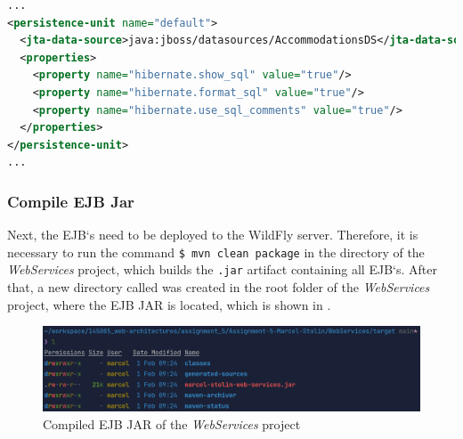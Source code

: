 \begin{lstlisting}[label=lst:03_depl_wildfly_datasource_persistance, caption=Default data source configuration, language=xml]
...
<persistence-unit name="default">
  <jta-data-source>java:jboss/datasources/AccommodationsDS</jta-data-source>
  <properties>
    <property name="hibernate.show_sql" value="true"/>
    <property name="hibernate.format_sql" value="true"/>
    <property name="hibernate.use_sql_comments" value="true"/>
  </properties>
</persistence-unit>
...
\end{lstlisting}


\subsubsection{Compile EJB Jar}\label{sec:03_depl_wildfly_jar}
Next, the EJB`s need to be deployed to the WildFly server. Therefore, it is necessary to run the command \texttt{\$ mvn clean package} in the directory of the \textit{WebServices} project, which builds the \texttt{.jar} artifact containing all EJB`s. After that, a new directory called  was created in the root folder of the \textit{WebServices} project, where the EJB JAR   is located, which is shown in .
\begin{figure}[h]
\centering
\includegraphics[scale=0.2]{images/03_depl/web-services-artifact}
\caption{Compiled EJB JAR of the \textit{WebServices} project}
\label{fig:03_depl_wildfly_jar_build}
\end{figure}


